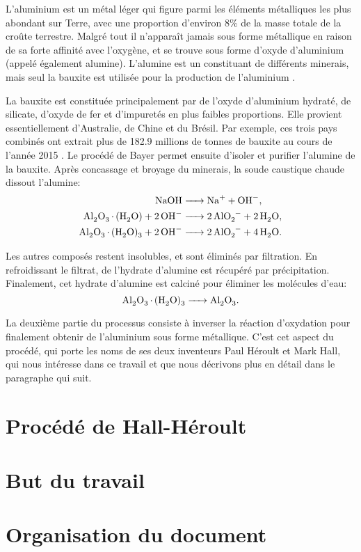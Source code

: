 L'aluminium est un métal léger qui figure parmi les éléments
métalliques les plus abondant sur Terre, avec une proportion d'environ
\num{8}\% de la masse totale de la croûte terrestre. Malgré tout il
n'apparaît jamais sous forme métallique en raison de sa forte affinité
avec l'oxygène, et se trouve sous forme d'oxyde d'aluminium 
(appelé également alumine). L'alumine est un constituant de différents
minerais, mais seul la bauxite est utilisée pour la production de
l'aluminium \cite{Hydro2018}.

La bauxite est constituée principalement par de l'oxyde d'aluminium
hydraté, de silicate, d'oxyde de fer et d'impuretés en plus faibles
proportions. Elle provient essentiellement d'Australie, de Chine et du
Brésil. Par exemple, ces trois pays combinés ont extrait plus de
\num{182.9} millions de tonnes de bauxite au cours de l'année \num{2015}
\cite{USGS2015}. Le procédé de Bayer permet ensuite d'isoler et
purifier l'alumine de la bauxite. Après concassage et broyage du
minerais, la soude caustique chaude dissout l'alumine:
\begin{align*}
  \cee{NaOH &-> Na+ + OH-},\\
  \cee{Al2O3.(H2O) + 2OH- &-> 2AlO2- + 2H2O},\\
  \cee{Al2O3.(H2O)3 + 2OH- &-> 2AlO2- + 4H2O}.
\end{align*}

Les autres composés restent insolubles, et sont éliminés par
filtration. En refroidissant le filtrat, de l'hydrate d'alumine est
récupéré par précipitation. Finalement, cet hydrate d'alumine est
calciné pour éliminer les molécules d'eau:
\begin{equation*}
  \cee{Al2O3.(H2O)3 -> Al2O3}.
\end{equation*}

La deuxième partie du processus consiste à inverser la réaction
d'oxydation pour finalement obtenir de l'aluminium sous forme
métallique. C'est cet aspect du procédé, qui porte les noms de ses
deux inventeurs Paul Héroult et Mark Hall, qui nous intéresse dans
ce travail et que nous décrivons plus en détail dans le paragraphe
qui suit.


\section{Procédé de Hall-Héroult}
\label{sec:introduction-hall-heroult}



\section{But du travail}
\label{sec:introduction-aims}



\section{Organisation du document}
\label{sec:introduction-organisation}

